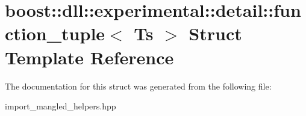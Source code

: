 \hypertarget{a00107}{}\section{boost\+:\+:dll\+:\+:experimental\+:\+:detail\+:\+:function\+\_\+tuple$<$ Ts $>$ Struct Template Reference}
\label{a00107}


The documentation for this struct was generated from the following file\+:\begin{DoxyCompactItemize}
\item 
import\+\_\+mangled\+\_\+helpers.\+hpp\end{DoxyCompactItemize}
